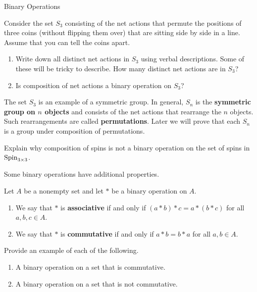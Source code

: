 \begin{section}{Binary Operations}
\begin{problem}\label{prob:introducing_S3}
Consider the set $S_3$ consisting of the net actions that permute the positions of three coins (without flipping them over) that are sitting side by side in a line.  Assume that you can tell the coins apart.
\begin{enumerate}[label=\rm{(\alph*)}]
\item Write down all distinct net actions in $S_3$ using verbal descriptions. Some of these will be tricky to describe. How many distinct net actions are in $S_3$?
\item Is composition of net actions a binary operation on $S_3$?
\end{enumerate}
\end{problem}

The set $S_3$ is an example of a symmetric group. In general, $S_n$ is the \textbf{symmetric group on $n$ objects} and consists of the net actions that rearrange the $n$ objects. Such rearrangements are called \textbf{permutations}. Later we will prove that each $S_n$ is a group under composition of permutations.

\begin{problem}
Explain why composition of spins is not a binary operation on the set of spins in $\operatorname{Spin}_{3\times 3}$.
\end{problem}

Some binary operations have additional properties.

\begin{definition}
Let $A$ be a nonempty set and let $*$ be a binary operation on $A$.
\begin{enumerate}[label=\rm{(\alph*)}]
\item We say that $*$ is \textbf{associative} if and only if $(a*b)*c=a*(b*c)$ for all $a,b,c\in A$.
\item We say that $*$ is \textbf{commutative} if and only if $a*b=b*a$ for all $a,b\in A$.
\end{enumerate}
\end{definition}

\begin{problem}
Provide an example of each of the following.
\begin{enumerate}[label=\rm{(\alph*)}]
\item A binary operation on a set that is commutative.
\item A binary operation on a set that is not commutative.
\end{enumerate}
\end{problem}


\end{section}
